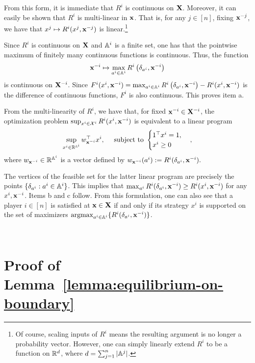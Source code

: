 From this form, it is immediate that $R^i$ is continuous on $\bX$. Moreover, it can easily be shown that $R^i$ is multi-linear in $\bx$. That is, for any $j \in [n]$, fixing $\bx^{-j}$, we have that $x^j \mapsto R^i ( x^j, \bx^{-j})$ is linear.\footnote{Of course, scaling inputs of $R^i$ means the resulting argument is no longer a probability vector. However, one can simply linearly extend $R^i$ to be a function on $\rr^{d}$, where $d = \sum_{j=1}^n | \aa^j |$.}

Since $R^i$ is continuous on $\bX$ and $\aa^i$ is a finite set, one has that the pointwise maximum of finitely many continuous functions is continuous. Thus, the function
\[
\bx^{-i} \mapsto \max_{ a^i \in \aa^i } R^i \left( \delta_{a^i} , \bx^{-i} \right) 
\]
is continuous on $\bX^{-i}$. Since $F^i ( x^i, \bx^{-i} ) =  \max_{ a^i \in \aa^i } R^i \left( \delta_{a^i} , \bx^{-i} \right) - R^i ( x^i, \bx^{-i})$ is the difference of continuous functions, $F^i$ is also continuous. This proves item a.

From the multi-linearity of $R^i$, we have that, for fixed $\bx^{-i} \in \bX^{-i}$, the optimization problem $\sup_{ x^i \in \XX^i } R^i ( x^i, \bx^{-i} )$ is equivalent to a linear program
\[
\sup_{ x^i \in \rr^{\aa^i}} w_{\bx^{-i}}^{\top} x^i, \quad \text{ subject to }
    \begin{cases}
     1^{\top} x^i = 1 , \\
     x^i \geq 0
    \end{cases},
\]
where $w_{\bx^{-i}} \in \rr^{\aa^i}$ is a vector defined by $ w_{\bx^{-i}}(a^i) :=  R^i (\delta_{a^i}, \bx^{-i} ). $

The vertices of the feasible set for the latter linear program are precisely the points $\{ \delta_{a^i} : a^i \in \aa^i \}$. This implies that $\max_{a^i} R^i (\delta_{a^i} , \bx^{-i} ) \geq R^i (x^i, \bx^{-i} ) $ for any $x^i, \bx^{-i}$. Items b and c follow. From this formulation, one can also see that a player $i \in [n]$ is satisfied at $\bx \in \bX$ if and only if its strategy $x^i$ is supported on the set of maximizers ${\rm argmax}_{a^i \in \aa^i} \{ R^i ( \delta_{a^i}, \bx^{-i} ) \}$. 

\ 

\section{Proof of Lemma~\ref{lemma:equilibrium-on-boundary}} \label{appendix:lemma}

